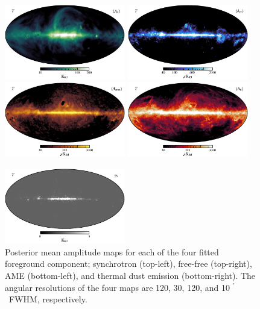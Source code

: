 \documentclass{aa}
\def\arcm{\ifmmode {^{\scriptstyle\prime}}
          \else $^{\scriptstyle\prime}$\fi}
\begin{document}
\begin{figure}[p]
  \center       
  \includegraphics[width=0.47\textwidth]{figs/synch_mean_120arcmin_T_w12_cb_c-swamp.pdf}
  \includegraphics[width=0.47\textwidth]{figs/ff_mean_30arcmin_T_w12_cb_c-freeze.pdf}\\
  \includegraphics[width=0.47\textwidth]{figs/ame_mean_120arcmin_T_w12_cb_c-amber.pdf}
  \includegraphics[width=0.47\textwidth]{figs/dust_mean_10arcmin_T_w12_cb_c-sunburst.pdf}
  \caption{Posterior mean amplitude maps for each of the four fitted
    foreground component; synchrotron (top-left), free-free
    (top-right), AME (bottom-left), and thermal dust
    emission (bottom-right). The angular resolutions of the
    four maps are 120, 30, 120, and 10\arcm\ FWHM, respectively.
  }
  \label{fig:diff_mean}
\vspace*{3mm}
  \center       
  \includegraphics[width=0.47\textwidth]{figs/synch_stddev_120arcmin_T_w12_cb_c-neutral.pdf}

\end{figure}
\end{document}
